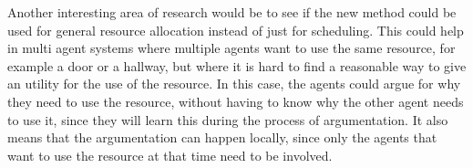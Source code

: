 Another interesting area of research would be to see if the new method
could be used for general resource allocation instead of just for
scheduling. This could help in multi agent systems where multiple agents
want to use the same resource, for example a door or a hallway, but where
it is hard to find a reasonable way to give an utility for the use of the
resource. In this case, the agents could argue for why they need to use the
resource, without having to know why the other agent needs to use it, since
they will learn this during the process of argumentation. It also means
that the argumentation can happen locally, since only the agents that want
to use the resource at that time need to be involved.
